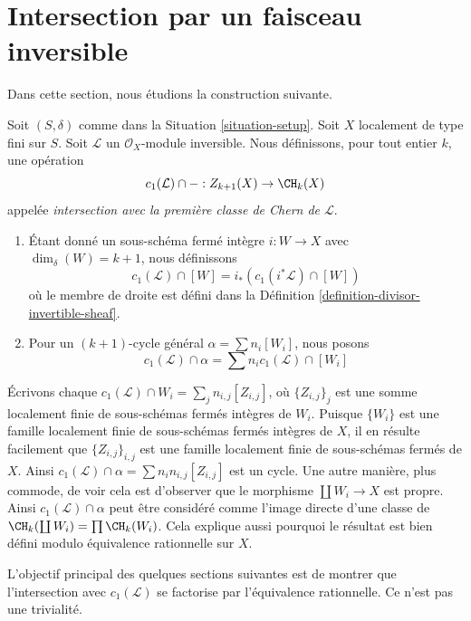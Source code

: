 \section{Intersection par un faisceau inversible}
\label{section-intersecting-with-divisors}

\noindent
Dans cette section, nous étudions la construction suivante.

\begin{definition}
\label{definition-cap-c1}
Soit $(S, \delta)$ comme dans la Situation \ref{situation-setup}.
Soit $X$ localement de type fini sur $S$.
Soit $\mathcal{L}$ un $\mathcal{O}_X$-module inversible.
Nous définissons, pour tout entier $k$, une opération
$$
c_1(\mathcal{L}) \cap - :
Z_{k + 1}(X) \to \CH_k(X)
$$
appelée {\it intersection avec la première classe de Chern de $\mathcal{L}$}.
\begin{enumerate}
\item Étant donné un sous-schéma fermé intègre $i : W \to X$ avec
$\dim_\delta(W) = k + 1$, nous définissons
$$
c_1(\mathcal{L}) \cap [W] = i_*(c_1({i^*\mathcal{L}}) \cap [W])
$$
où le membre de droite est défini dans la
Définition \ref{definition-divisor-invertible-sheaf}.
\item Pour un $(k + 1)$-cycle général $\alpha = \sum n_i [W_i]$, nous posons
$$
c_1(\mathcal{L}) \cap \alpha = \sum n_i c_1(\mathcal{L}) \cap [W_i]
$$
\end{enumerate}
\end{definition}

\noindent
Écrivons chaque $c_1(\mathcal{L}) \cap W_i = \sum_j n_{i, j} [Z_{i, j}]$,
où $\{Z_{i, j}\}_j$ est une somme localement finie
de sous-schémas fermés intègres de $W_i$. Puisque $\{W_i\}$ est une famille
localement finie de sous-schémas fermés intègres de $X$, il en résulte
facilement que $\{Z_{i, j}\}_{i, j}$ est une famille localement finie
de sous-schémas fermés de $X$. Ainsi
$c_1(\mathcal{L}) \cap \alpha = \sum n_in_{i, j}[Z_{i, j}]$
est un cycle. Une autre manière, plus commode, de voir cela
est d'observer que le morphisme $\coprod W_i \to X$ est
propre. Ainsi $c_1(\mathcal{L}) \cap \alpha$ peut être considéré
comme l'image directe d'une classe de $\CH_k(\coprod W_i) = \prod \CH_k(W_i)$.
Cela explique aussi pourquoi le résultat est bien défini modulo équivalence
rationnelle sur $X$.

\medskip\noindent
L'objectif principal des quelques sections suivantes est de montrer que l'intersection avec
$c_1(\mathcal{L})$ se factorise par l'équivalence rationnelle.
Ce n'est pas une trivialité.


